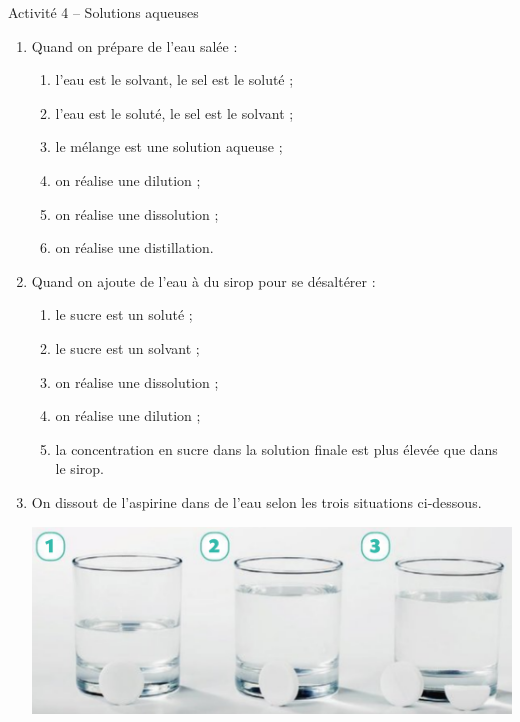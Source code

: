 
\cfoot{} %
\usepackage{setspace}
\usepackage{rotating}



\begin{header}
Activité 4 -- Solutions aqueuses
\end{header}

\begin{enumerate}
\item Quand on prépare de l'eau salée :
\begin{multicols}{2}
\begin{enumerate}
\item l'eau est le solvant, le sel est le soluté ;
\item l'eau est le soluté, le sel est le solvant ;
\item le mélange est une solution aqueuse ;
\item on réalise une dilution ;
\item on réalise une dissolution ;
\item on réalise une distillation. 
\end{enumerate}
\end{multicols}

\item Quand on ajoute de l'eau à du sirop pour se désaltérer :
\begin{multicols}{2}
\begin{enumerate}
\item le sucre est un soluté ;
\item le sucre est un solvant ;
\item on réalise une dissolution ;
\item on réalise une dilution ;
\item la concentration en sucre dans la solution finale est plus élevée que dans le sirop.
\end{enumerate}
\end{multicols}

\item On dissout de l'aspirine dans de l'eau selon les trois situations ci-dessous.
\begin{multicols}{2}
\includegraphics[scale=0.21]{images/exo10p43.png}


\end{multicols}
\end{enumerate}
